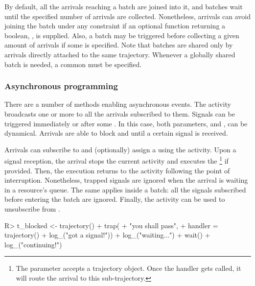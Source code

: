 \documentclass[
  nojss]{jss}
\begin{document}
By default, all the arrivals reaching a batch are joined into it, and
batches wait until the specified number of arrivals are collected.
Nonetheless, arrivals can avoid joining the batch under any constraint
if an optional function returning a boolean, , is supplied.
Also, a batch may be triggered before collecting a given amount of
arrivals if some  is specified. Note that batches are
shared only by arrivals directly attached to the same trajectory.
Whenever a globally shared batch is needed, a common  must be
specified.

\hypertarget{asynchronous-programming}{%
\subsubsection{Asynchronous
programming}\label{asynchronous-programming}}

There are a number of methods enabling asynchronous events. The
 activity broadcasts one or more  to all the
arrivals subscribed to them. Signals can be triggered immediately or
after some . In this case, both parameters, 
and , can be dynamical. Arrivals are able to block and
 until a certain signal is received.

Arrivals can subscribe to  and (optionally) assign a
 using the  activity. Upon a signal
reception, the arrival stops the current activity and executes the
\footnote{The  parameter accepts a
  trajectory object. Once the handler gets called, it will route the
  arrival to this sub-trajectory.} if provided. Then, the execution
returns to the activity following the point of interruption.
Nonetheless, trapped signals are ignored when the arrival is waiting in
a resource's queue. The same applies inside a batch: all the signals
subscribed before entering the batch are ignored. Finally, the
 activity can be used to unsubscribe from .

\begin{CodeChunk}
\begin{CodeInput}
R> t_blocked <- trajectory() %
+   trap(
+     "you shall pass",
+     handler = trajectory() %
+       log_("got a signal!")) %
+   log_("waiting...") %
+   wait() %
+   log_("continuing!")
\end{CodeInput}
\end{CodeChunk}
\end{document}
